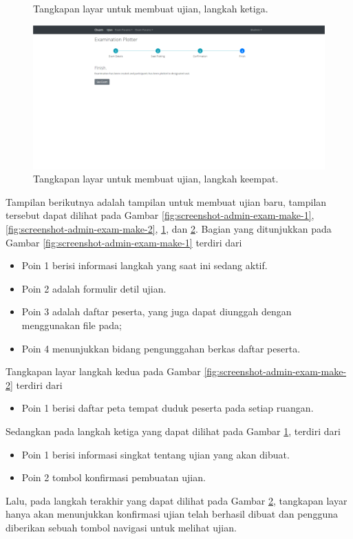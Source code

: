 \begin{figure}
        \caption{Tangkapan layar untuk membuat ujian, langkah ketiga.}
        \label{fig:screenshot-admin-exam-make-3}
    \end{figure}\begin{figure}
        \centering
        \includegraphics[width=0.7\paperwidth]{Gambar/implemented-interface/admin/ujian-make-4.png}
        \caption{Tangkapan layar untuk membuat ujian, langkah keempat.}
        \label{fig:screenshot-admin-exam-make-4}
    \end{figure}
    Tampilan berikutnya adalah tampilan untuk membuat ujian baru, tampilan tersebut dapat dilihat
    pada Gambar \ref{fig:screenshot-admin-exam-make-1}, \ref{fig:screenshot-admin-exam-make-2},
    \ref{fig:screenshot-admin-exam-make-3}, dan \ref{fig:screenshot-admin-exam-make-4}. Bagian
    yang ditunjukkan pada Gambar \ref{fig:screenshot-admin-exam-make-1} terdiri dari
    \begin{itemize}
        \item Poin 1 berisi informasi langkah yang saat ini sedang aktif.
        \item Poin 2 adalah formulir detil ujian.
        \item Poin 3 adalah daftar peserta, yang juga dapat diunggah dengan menggunakan file pada;
        \item Poin 4 menunjukkan bidang pengunggahan berkas daftar peserta.
    \end{itemize}
    Tangkapan layar langkah kedua pada Gambar \ref{fig:screenshot-admin-exam-make-2} terdiri dari
    \begin{itemize}
        \item Poin 1 berisi daftar peta tempat duduk peserta pada setiap ruangan.
    \end{itemize}
    Sedangkan pada langkah ketiga yang dapat dilihat pada Gambar \ref{fig:screenshot-admin-exam-make-3},
    terdiri dari
    \begin{itemize}
        \item Poin 1 berisi informasi singkat tentang ujian yang akan dibuat.
        \item Poin 2 tombol konfirmasi pembuatan ujian.
    \end{itemize}
    Lalu, pada langkah terakhir yang dapat dilihat pada Gambar \ref{fig:screenshot-admin-exam-make-4},
    tangkapan layar hanya akan menunjukkan konfirmasi ujian telah berhasil dibuat dan pengguna
    diberikan sebuah tombol navigasi untuk melihat ujian.
    
